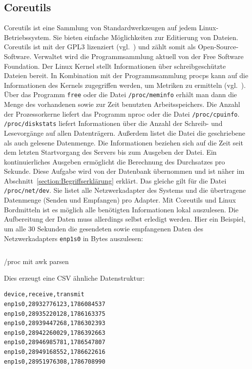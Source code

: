 \subsection{Coreutils}
Coreutils ist eine Sammlung von Standardwerkzeugen auf jedem
Linux-Betriebssystem. Sie bieten einfache Möglichkeiten zur Editierung von
Dateien. Coreutils ist mit der GPL3 lizenziert (vgl.~\cite{coreutils}) und
zählt somit als Open-Source-Software. Verwaltet wird die Programmsammlung
aktuell von der Free Software Foundation. Der Linux Kernel stellt Informationen
über schreibgeschützte Dateien bereit. In Kombination mit der Programmsammlung
procps kann auf die Informationen des Kernels zugegriffen werden, um Metriken
zu ermitteln (vgl.~\cite{procps}). Über das Programm \texttt{free} oder die
Datei \texttt{/proc/meminfo} erhält man dann die Menge des vorhandenen sowie
zur Zeit benutzten Arbeitsspeichers. Die Anzahl der Prozessorkerne liefert das
Programm nproc oder die Datei \texttt{/proc/cpuinfo}. \texttt{/proc/diskstats}
liefert Informationen über die Anzahl der Schreib- und Lesevorgänge auf allen
Datenträgern. Außerdem listet die Datei die geschriebene als auch gelesene
Datenmenge. Die Informationen beziehen sich auf die Zeit seit dem letzten
Startvorgang des Servers bis zum Ausgeben der Datei. Ein kontinuierliches
Ausgeben ermöglicht die Berechnung des Durchsatzes pro Sekunde. Diese Aufgabe
wird von der Datenbank übernommen und ist näher im
Abschnitt~\ref{section:Begriffserklärung} erklärt. Das gleiche gilt für die
Datei \texttt{/proc/net/dev}. Sie listet alle Netzwerkadapter des Systems und
die übertragene Datenmenge (Senden und Empfangen) pro Adapter. Mit Coreutils
und Linux Bordmitteln ist es möglich alle benötigten Informationen lokal
auszulesen. Die Aufbereitung der Daten muss allerdings selbst erledigt werden.
Hier ein Beispiel, um alle 30 Sekunden die gesendeten sowie empfangenen Daten
des Netzwerkadapters \texttt{enp1s0} in Bytes auszulesen:

\begin{listing}
  \inputminted{bash}{../listings/coreutils-awk.txt}
  \caption{/proc mit awk parsen}
  \label{lst:aw}
\end{listing}

Dies erzeugt eine \gls{CSV} ähnliche Datenstruktur:

\begin{center}
\begin{verbatim}
device,receive,transmit
enp1s0,28932776123,1786084537
enp1s0,28935220128,1786163375
enp1s0,28939447268,1786302393
enp1s0,28942260029,1786392663
enp1s0,28946985781,1786547807
enp1s0,28949168552,1786622616
enp1s0,28951976308,1786708990
\end{verbatim}
\end{center}

